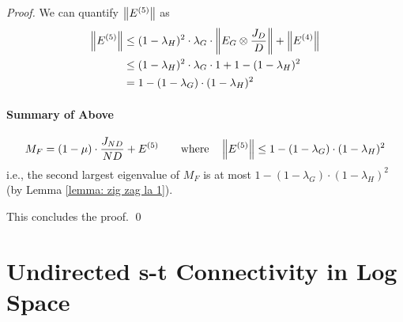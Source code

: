 \begin{proof}
	We can quantify $\left\lVert E^{(5)}\right\rVert$ as 
	\begin{align}
		\left\lVert E^{(5)}\right\rVert
		& \leq ( 1- \lambda_H)^2 \cdot \lambda_G \cdot \left\lVert E_G \otimes \frac{J_D}{D}\right\rVert + \left\lVert E^{(4)}\right\rVert \\
		& \leq ( 1- \lambda_H)^2 \cdot \lambda_G \cdot 1 + 1 - (1 - \lambda_H) ^2 \\
		& = {1 - (1 - \lambda_G) \cdot (1 - \lambda_H) ^ 2}
	\end{align}
	
	\begin{mdframed}
		\paragraph{Summary of Above}
		\begin{equation}
			M_F = (1 - \mu) \cdot \frac{J_{ND}}{ND} + E^{(5)} \quad\quad \text{where} \quad \left\lVert E^{(5)}\right\rVert \leq 1 - (1 - \lambda_G) \cdot (1 - \lambda_H) ^ 2
		\end{equation}
		i.e., the second largest eigenvalue of $M_F$ is at most $1 - (1 - \lambda_G) \cdot (1 - \lambda_H) ^ 2$ (by Lemma \ref{lemma: zig zag la 1}). 
	\end{mdframed}
	
	This concludes the proof. \qed
\end{proof}


\section{Undirected s-t Connectivity in Log Space}
